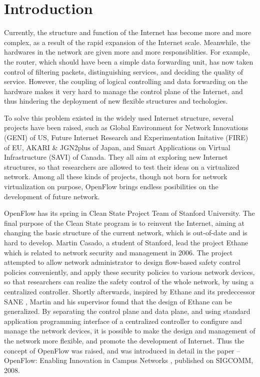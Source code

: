 
\pagestyle{plain}
\renewcommand{\chaptername}{Chapter \CJKnumber{\thechapter}}

\chapter{Introduction}
\label{chap:intro}

Currently, the structure and function of the Internet has become more and more complex, as a result of the rapid expansion of the Internet scale. Meanwhile, the hardwares in the network are given more and more responsiblities. For example, the router, which should have been a simple data forwarding unit, has now taken control of filtering packets, distinguishing services, and deciding the quality of service. However, the coupling of logical controlling and data forwarding on the hardware makes it very hard to manage the control plane of the Internet, and thus hindering the deployment of new flexible structures and techologies.

To solve this problem existed in the widely used Internet structure, several projects have been raised, such as Global Environment for Network Innovations (GENI) \cite{geni} of US, Future Internet Research and Experimentation Initative (FIRE) \cite{fire} of EU, AKARI \& JGN2plus \cite{akari} of Japan, and Smart Applications on Virtual Infrastructure (SAVI) \cite{savi} of Canada. They all aim at exploring new Internet structures, so that researchers are allowed to test their ideas on a virtualized network. Among all these kinds of projects, though not born for network virtualization on purpose, OpenFlow \cite{openflow} brings endless posibilities on the development of future network.

OpenFlow has its spring in Clean State Project Team of Stanford University. The final purpose of the Clean State program is to reinvent the Internet, aiming at changing the basic structure of the current network, which is out-of-date and is hard to develop. Martin Casado, a student of Stanford, lead the project Ethane \cite{ethane} which is related to network security and management in 2006. The project attempted to allow network administrator to design flow-based safety control policies conveniently, and apply these security policies to various network devices, so that researchers can realize the safety control of the whole network, by using a centralized controller. Shortly afterwards, inspired by Ethane and its predeccessor SANE \cite{sane}, Martin and his supervisor found that the design of Ethane can be generalized. By separating the control plane and data plane, and using standard application programming interface of a centralized controller to configure and manage the network devices, it is possible to make the design and management of the network more flexible, and promote the development of Internet. Thus the concept of OpenFlow was raised, and was introduced in detail in the paper -- OpenFlow: Enabling Innovation in Campus Networks \cite{openflow}, published on SIGCOMM, 2008. 

